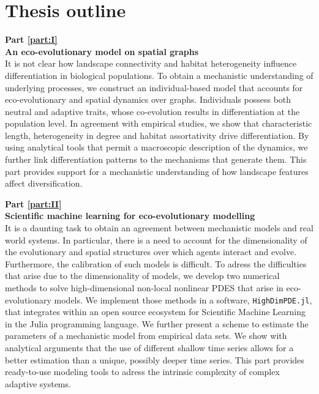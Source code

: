 \section{Thesis outline}
\label{sec:intro:structure}

\textbf{Part \ref{part:I}\\
An eco-evolutionary model on spatial graphs} \\[0.2em]
It is not clear how landscape connectivity and habitat heterogeneity influence differentiation in biological populations. 
%
To obtain a mechanistic understanding of underlying processes, we construct an individual-based model that accounts for eco-evolutionary and spatial dynamics over graphs. 
%
Individuals possess both neutral and adaptive traits, whose co-evolution results in differentiation at the population level.
%
In agreement with empirical studies, we show that characteristic length, heterogeneity in degree and habitat assortativity drive differentiation.
%
By using analytical tools that permit a macroscopic description of the dynamics, we further link differentiation patterns to the mechanisms that generate them.
%
This part provides support for a mechanistic understanding of how landscape features affect diversification.

\textbf{Part \ref{part:II}\\
Scientific machine learning for eco-evolutionary modelling} \\[0.2em]
%
It is a daunting task to obtain an agreement between mechanistic models and real world systems. In particular, there is a need to account for the dimensionality of the evolutionary and spatial structures over which agents interact and evolve. Furthermore, the calibration of such models is difficult.
%
To adress the difficulties that arise due to the dimensionality of models, we develop two numerical methods to solve high-dimensional non-local nonlinear PDES that arise in eco-evolutionary models. We implement those methods in a software, \texttt{HighDimPDE.jl}, that integrates within an open source ecosystem for Scientific Machine Learning in the Julia programming language.
%
We further present a scheme to estimate the parameters of a mechanistic model from empirical data sets. We show with analytical arguments that the use of different shallow time series allows for a better estimation than a unique, possibly deeper time series.
%
This part provides ready-to-use modeling tools to adress the intrinsic complexity of complex adaptive systems.

